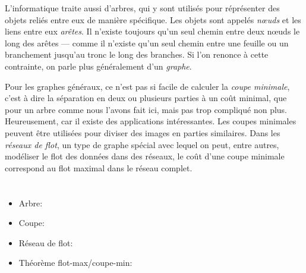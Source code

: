 {{L’informatique traite aussi d’arbres, qui y sont utilisés pour réprésenter des objets reliés entre eux de manière spécifique. Les objets sont appelés \emph{nœuds} et les liens entre eux \emph{arêtes}. Il n’existe toujours qu’un seul chemin entre deux nœuds le long des arêtes — comme il n’existe qu’un seul chemin entre une feuille ou un branchement jusqu’au tronc le long des branches. Si l’on renonce à cette contrainte, on parle plus généralement d’un \emph{graphe}.

Pour les graphes généraux, ce n’est pas si facile de calculer la \emph{coupe minimale}, c’est à dire la séparation en deux ou plusieurs parties à un coût minimal, que pour un arbre comme nous l’avons fait ici, mais pas trop compliqué non plus. Heureusement, car il existe des applications intéressantes. Les coupes minimales peuvent être utilisées pour diviser des images en parties similaires. Dans les \emph{réseaux de flot}, un type de graphe spécial avec lequel on peut, entre autres, modéliser le flot des données dans des réseaux, le coût d’une coupe minimale correspond au flot maximal dans le réseau complet.



\section*{\BrochureWebsitesAndKeywords}
{\raggedright
\begin{itemize}
  \item Arbre: \href{https://fr.wikipedia.org/wiki/Arbre_(th\%C3\%A9orie_des_graphes)}{}
  \item Coupe: \href{https://fr.wikipedia.org/wiki/Coupe_(th\%C3\%A9orie_des_graphes)}{}
  \item Réseau de flot: \href{https://fr.wikipedia.org/wiki/R\%C3\%A9seau_de_flot}{}
  \item Théorème flot-max/coupe-min: \href{https://fr.wikipedia.org/wiki/Th\%C3\%A9or\%C3\%A8me_flot-max/coupe-min}{}
\end{itemize}


}

}{}

}
